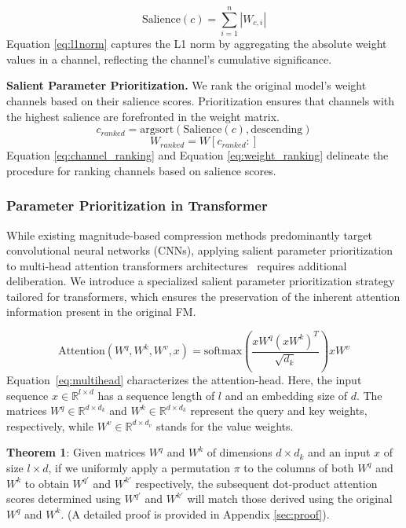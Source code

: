 \begin{equation}
\text{Salience}(c) = \sum_{i=1}^{n} |W_{c,i}|
\label{eq:l1norm}
\end{equation}
Equation \ref{eq:l1norm} captures the L1 norm by aggregating the absolute weight values in a channel, reflecting the channel's cumulative significance.

\textbf{Salient Parameter Prioritization.} 
We rank the original model's weight channels based on their salience scores. Prioritization ensures that channels with the highest salience are forefronted in the weight matrix.
\begin{equation}
c_{ranked} = \text{argsort}(\text{Salience}(c), \text{descending})
\label{eq:channel_ranking}
\end{equation}
\begin{equation}
W_{ranked} = W[c_{ranked}:]
\label{eq:weight_ranking}
\end{equation}
Equation \ref{eq:channel_ranking} and Equation \ref{eq:weight_ranking} delineate the procedure for ranking channels based on salience scores.


 \subsubsection{Parameter Prioritization in Transformer}
While existing magnitude-based compression methods predominantly target convolutional neural networks (CNNs), applying salient parameter prioritization to multi-head attention transformers architectures~\citep{vaswani2017transformer} requires additional deliberation. We introduce a specialized salient parameter prioritization strategy tailored for transformers, which ensures the preservation of the inherent attention information present in the original FM.

\begin{equation}
\label{eq:multihead}
\text{Attention}(W^q,W^k,W^v,x) = \text{softmax}\left(\frac{xW^q (xW^k)^T}{\sqrt{d_k}}\right) xW^v
\end{equation}
Equation~\ref{eq:multihead} characterizes the attention-head. Here, the input sequence $x\in \mathbb{R}^{l\times d}$ has a sequence length of $l$ and an embedding size of $d$. The matrices $W^q \in \mathbb{R}^{d\times d_k}$ and $W^k \in \mathbb{R}^{d\times d_k}$ represent the query and key weights, respectively, while $W^v \in \mathbb{R}^{d\times d_v}$ stands for the value weights.

\textbf{Theorem 1}: Given matrices $W^q$ and $W^k$ of dimensions $d \times d_k$ and an input $x$ of size $l \times d$, if we uniformly apply a permutation $\pi$ to the columns of both $W^q$ and $W^k$ to obtain $W^{q'}$ and $W^{k'}$ respectively, the subsequent dot-product attention scores determined using $W^{q'}$ and $W^{k'}$ will match those derived using the original $W^q$ and $W^k$. (A detailed proof is provided in Appendix \ref{sec:proof}).



